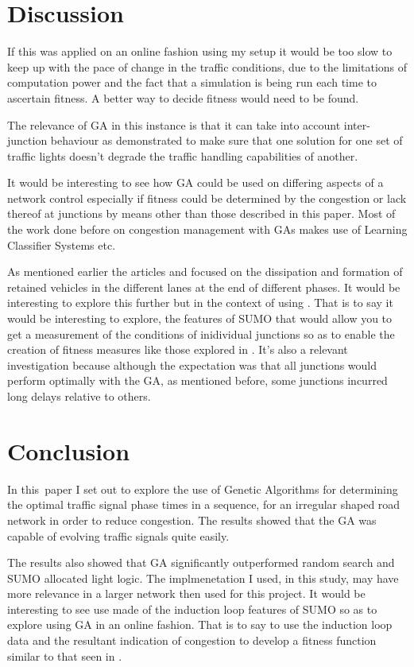 \documentclass[a4paper,10pt]{article}
\begin{document}
\section{Discussion}
If this was applied on an online fashion using my setup it would be too slow to keep up with the pace of change in the traffic 
conditions, due to the limitations of computation power and the fact that a simulation is being run each time to ascertain fitness. 
A better way to decide fitness would need to be found.
	
The relevance of GA in this instance is that it can take into account inter-junction behaviour as demonstrated to make sure that one 
solution for one set of traffic lights doesn’t degrade the traffic handling capabilities of another.

It would be interesting to see how GA could be used on differing aspects of a network control especially if fitness could be determined 
by the congestion or lack thereof at junctions by means other than those described in this paper. Most of the work done before on 
congestion management with GAs makes use of Learning Classifier Systems etc. 

As mentioned earlier the articles \cite{Multi-agent} and 
\cite{realcode} focused on the dissipation and formation of retained vehicles in the different lanes at the end of different phases. It 
would be interesting to explore this further but in the context of using \@SUMO. That is to say it would be interesting to explore, the
features of SUMO that would allow you to get a measurement of the conditions of inidividual junctions so as to enable the creation of
fitness measures like those explored in \cite{Multi-agent}. It's also a relevant investigation because although the expectation was that
all junctions would perform optimally with the GA, as mentioned before, some junctions incurred long delays relative to others.


\section{Conclusion}
In this paper I set out to explore the use of Genetic Algorithms for determining the optimal traffic signal phase times in a sequence,
for an irregular shaped road network in order to reduce congestion. The results showed that the GA was capable of evolving traffic signals
quite easily. 

The results also showed that GA significantly outperformed random search and SUMO allocated light logic. The implmenetation I used, in this 
study, may have more relevance in a larger network then used for this project. It would be interesting to see use made of the induction
loop features of SUMO so as to explore using GA in an online fashion. That is to say to use the induction loop data and the resultant 
indication of congestion to develop a fitness function similar to that seen in \cite{Multi-agent}.



\end{document}
